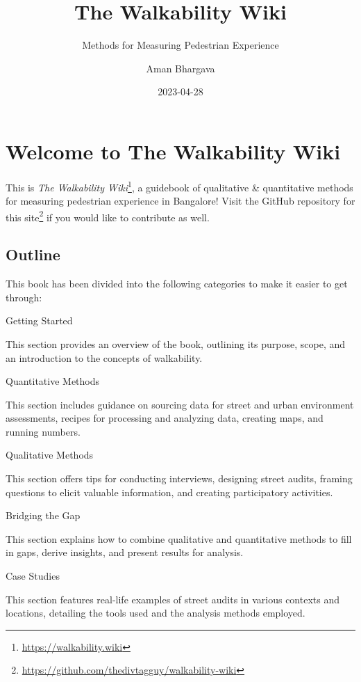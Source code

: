 \documentclass[
]{latex/krantz}
\title{The Walkability Wiki}
\subtitle{Methods for Measuring Pedestrian Experience}
\author{Aman Bhargava}
\date{2023-04-28}
\renewcommand{\href}[2]{#2\footnote{\url{#1}}}
\DeclareRobustCommand{\href}[2]{#2\footnote{\url{#1}}}
\begin{document}
\maketitle

{
\hypersetup{linkcolor=}
\setcounter{tocdepth}{3}
\tableofcontents
}
\hypertarget{welcome-to-the-walkability-wiki}{%
\section*{Welcome to The Walkability Wiki}\label{welcome-to-the-walkability-wiki}}


This is \href{https://walkability.wiki}{\emph{The Walkability Wiki}}, a guidebook of qualitative \& quantitative methods for measuring pedestrian experience in Bangalore! Visit the \href{https://github.com/thedivtagguy/walkability-wiki}{GitHub repository for this site} if you would like to contribute as well.

\hypertarget{outline}{%
\subsection*{Outline}\label{outline}}


This book has been divided into the following categories to make it easier to get through:

Getting Started

This section provides an overview of the book, outlining its purpose, scope, and an introduction to the concepts of walkability.

Quantitative Methods

This section includes guidance on sourcing data for street and urban environment assessments, recipes for processing and analyzing data, creating maps, and running numbers.

Qualitative Methods

This section offers tips for conducting interviews, designing street audits, framing questions to elicit valuable information, and creating participatory activities.

Bridging the Gap

This section explains how to combine qualitative and quantitative methods to fill in gaps, derive insights, and present results for analysis.

Case Studies

This section features real-life examples of street audits in various contexts and locations, detailing the tools used and the analysis methods employed.
\end{document}
